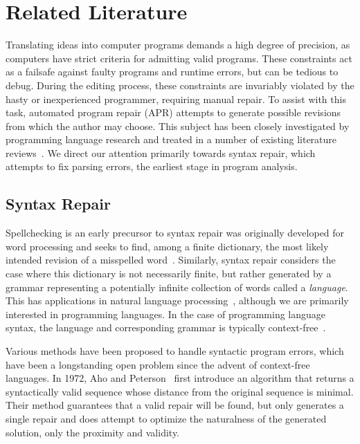 \chapter{\rm\bfseries Related Literature}
\label{ch:litreview}

Translating ideas into computer programs demands a high degree of precision, as computers have strict criteria for admitting valid programs. These constraints act as a failsafe against faulty programs and runtime errors, but can be tedious to debug. During the editing process, these constraints are invariably violated by the hasty or inexperienced programmer, requiring manual repair. To assist with this task, automated program repair (APR) attempts to generate possible revisions from which the author may choose. This subject has been closely investigated by programming language research and treated in a number of existing literature reviews~\cite{monperrus2018living, le2021automatic}. We direct our attention primarily towards syntax repair, which attempts to fix parsing errors, the earliest stage in program analysis.

\section{Syntax Repair}

Spellchecking is an early precursor to syntax repair was originally developed for word processing and seeks to find, among a finite dictionary, the most likely intended revision of a misspelled word~\cite{kernighan1990spelling}. Similarly, syntax repair considers the case where this dictionary is not necessarily finite, but rather generated by a grammar representing a potentially infinite collection of words called a \textit{language}. This has applications in natural language processing~\cite{bryant2023grammatical}, although we are primarily interested in programming languages. In the case of programming language syntax, the language and corresponding grammar is typically context-free~\cite{chomsky1959algebraic}.

Various methods have been proposed to handle syntactic program errors, which have been a longstanding open problem since the advent of context-free languages. In 1972, Aho and Peterson~\cite{aho1972minimum} first introduce an algorithm that returns a syntactically valid sequence whose distance from the original sequence is minimal. Their method guarantees that a valid repair will be found, but only generates a single repair and does attempt to optimize the naturalness of the generated solution, only the proximity and validity.

